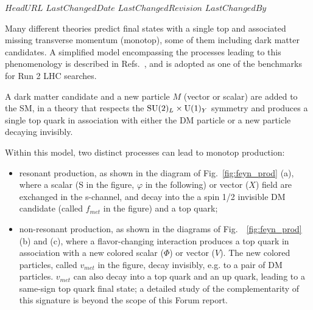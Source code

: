 \svnidlong
{$HeadURL$}
{$LastChangedDate$}
{$LastChangedRevision$}
{$LastChangedBy$}

Many different theories predict final states with a single top and associated missing 
transverse momentum (monotop), some of them including dark matter candidates. 
A simplified model encompassing the processes leading to this phenomenology is described in Refs.~\cite{AndreaFuksMaltoni,Agram:2013wda,Boucheneb:2014wza},
and is adopted as one of the benchmarks for Run 2 LHC searches. 

A dark matter candidate \DMParticle{} and a new particle $M$ (vector or scalar) 
are added to the SM, in a theory that respects the $\mathrm{SU}(2)_{L} \times \mathrm{U}(1)_{Y}$ symmetry 
and produces a single top quark in association with either the DM particle or a new particle
decaying invisibly. 

Within this model, two distinct processes can lead to monotop production:
\begin{itemize}
	\item resonant production, as shown in the diagram of Fig.~\ref{fig:feyn_prod} (a), where a scalar (S in the figure, $\varphi$ in the following) or vector ($X$) field are exchanged in the s-channel, and decay into the a spin 1/2 invisible DM candidate (called $f_{met}$ in the figure) and a top quark;
	\item non-resonant production, as shown in the diagrams of Fig.~~\ref{fig:feyn_prod} (b) and (c), where a flavor-changing interaction produces a top quark in association with a new colored scalar ($\Phi$) or vector ($V$). The new colored particles, called $v_{met}$ in the figure, decay invisibly, e.g. to a pair of DM particles. $v_{met}$ can also decay into a top quark and an up quark, leading to a same-sign top quark final state; a detailed study of the complementarity of this signature is beyond the scope of this Forum report.  
\end{itemize}

